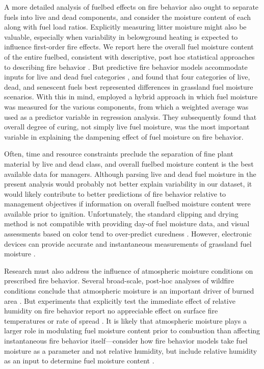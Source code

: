 \documentclass[referee, 
		     sn-basic]{sn-jnl}
\begin{document}
\begin{linenumbers}
A more detailed analysis of fuelbed effects on fire behavior also ought
to separate fuels into live and dead components, and consider the
moisture content of each along with fuel load ratios. Explicitly
measuring litter moisture might also be valuable, especially when
variability in belowground heating is expected to influence first-order
fire effects. We report here the overall fuel moisture content of the
entire fuelbed, consistent with descriptive, post hoc statistical
approaches to describing fire behavior
\citep{trollope1978, trollope1985, bidwell1992, trollope2002, mcgranahan2016}.
But predictive fire behavior models accommodate inputs for live and dead
fuel categories \citep{scott2005}, and \citet{kidnie2015a} found that
four categories of live, dead, and senescent fuels best represented
differences in grassland fuel moisture scenarios. With this in mind,
\citet{cruz2015} employed a hybrid approach in which fuel moisture was
measured for the various components, from which a weighted average was
used as a predictor variable in regression analysis. They subsequently
found that overall degree of curing, not simply live fuel moisture, was
the most important variable in explaining the dampening effect of fuel
moisture on fire behavior.

Often, time and resource constraints preclude the separation of fine
plant material by live and dead class, and overall fuelbed moisture
content is the best available data for managers. Although parsing live
and dead fuel moisture in the present analysis would probably not better
explain variability in our dataset, it would likely contribute to better
predictions of fire behavior relative to management objectives if
information on overall fuelbed moisture content were available prior to
ignition. Unfortunately, the standard clipping and drying method is not
compatible with providing day-of fuel moisture data, and visual
assessments based on color tend to over-predict curedness
\citep{kidnie2015a}. However, electronic devices can provide accurate
and instantaneous measurements of grassland fuel moisture
\citep{mcgranahan2019}.

Research must also address the influence of atmospheric moisture
conditions on prescribed fire behavior. Several broad-scale, post-hoc 
analyses of wildfire conditions conclude that atmospheric moisture is an
important driver of burned area \citep{evett2008, reid2010, sedano2014}.
But experiments that explicitly test the immediate effect of relative
humidity on fire behavior report no appreciable effect on surface fire
temperatures or rate of spread \citep{sparling1966, trollope1985}. It is
likely that atmospheric moisture plays a larger role in modulating fuel
moisture content prior to combustion than affecting instantaneous fire
behavior itself---consider how fire behavior models take fuel moisture
as a parameter and not relative humidity, but include relative humidity
as an input to determine fuel moisture content
\citep{rothermel1983, cruz2016}.


\end{linenumbers}
\end{document}
